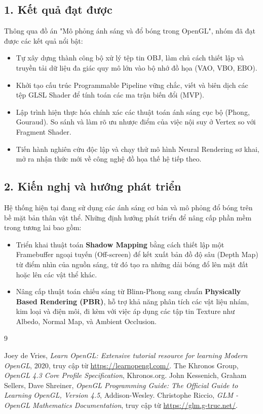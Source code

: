 \documentclass[13pt, a4paper]{extarticle}
\begin{document}
\subsection*{1. Kết quả đạt được}
Thông qua đồ án "Mô phỏng ánh sáng và đổ bóng trong OpenGL", nhóm đã đạt được các kết quả nổi bật:
\begin{itemize}
    \item Tự xây dựng thành công bộ xử lý tệp tin OBJ, làm chủ cách thiết lập và truyền tải dữ liệu đa giác quy mô lớn vào bộ nhớ đồ họa (VAO, VBO, EBO).
    \item Khởi tạo cấu trúc Programmable Pipeline vững chắc, viết và biên dịch các tệp GLSL Shader để tính toán các ma trận biến đổi (MVP).
    \item Lập trình hiện thực hóa chính xác các thuật toán ánh sáng cục bộ (Phong, Gouraud). So sánh và làm rõ ưu nhược điểm của việc nội suy ở Vertex so với Fragment Shader.
    \item Tiến hành nghiên cứu độc lập và chạy thử mô hình Neural Rendering sơ khai, mở ra nhận thức mới về công nghệ đồ họa thế hệ tiếp theo.
\end{itemize}

\subsection*{2. Kiến nghị và hướng phát triển}
Hệ thống hiện tại đang sử dụng các ánh sáng cơ bản và mô phỏng đổ bóng trên bề mặt bản thân vật thể. Những định hướng phát triển để nâng cấp phần mềm trong tương lai bao gồm:
\begin{itemize}
    \item Triển khai thuật toán \textbf{Shadow Mapping} bằng cách thiết lập một Framebuffer ngoại tuyến (Off-screen) để kết xuất bản đồ độ sâu (Depth Map) từ điểm nhìn của nguồn sáng, từ đó tạo ra những dải bóng đổ lên mặt đất hoặc lên các vật thể khác.
    \item Nâng cấp thuật toán chiếu sáng từ Blinn-Phong sang chuẩn \textbf{Physically Based Rendering (PBR)}, hỗ trợ khả năng phân tích các vật liệu nhám, kim loại và điện môi, đi kèm với việc áp dụng các tập tin Texture như Albedo, Normal Map, và Ambient Occlusion.
\end{itemize}

\newpage
\begin{thebibliography}{9}
 Joey de Vries, \textit{Learn OpenGL: Extensive tutorial resource for learning Modern OpenGL}, 2020, truy cập từ \url{https://learnopengl.com/}.
 The Khronos Group, \textit{OpenGL 4.3 Core Profile Specification}, Khronos.org.
 John Kessenich, Graham Sellers, Dave Shreiner, \textit{OpenGL Programming Guide: The Official Guide to Learning OpenGL, Version 4.5}, Addison-Wesley.
 Christophe Riccio, \textit{GLM - OpenGL Mathematics Documentation}, truy cập từ \url{https://glm.g-truc.net/}.
\end{thebibliography}
\end{document}

